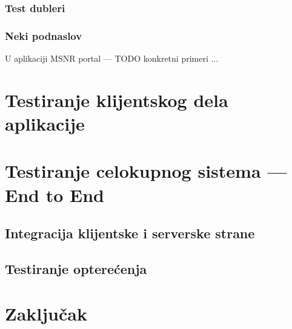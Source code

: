 \documentclass[12pt,oneside]{memoir}
\begin{document}
\subsection{Test dubleri}

\par 

\subsection{Neki podnaslov}
U aplikaciji MSNR portal --- TODO konkretni primeri ... 

\chapter{Testiranje klijentskog dela aplikacije}
\label{chp:elm}

\chapter{Testiranje celokupnog sistema --- End to End}
\label{chp:e2e}

\section{Integracija klijentske i serverske strane}

\section{Testiranje opterećenja}

\chapter{Zaključak}

\literatura

\backmatter


\end{document}
